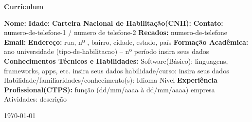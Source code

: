 \documentclass[a4paper,10pt]{report}
\begin{document}
\pagestyle{empty}
\begin{flushleft}
\begin{center}
\huge 
\textbf{Currículum}
\linebreak
\end{center}
  \textbf{Nome:} 
  \linebreak
  \textbf{Idade:} 
  \textbf{Carteira Nacional de Habilitação(CNH):}
  \linebreak
  \textbf{Contato:} numero-de-telefone-1 / numero de telefone-2
  \textbf{Recados:} numero-de-telefone
  \linebreak
  \textbf{ Email:} 
  \textbf{Endereço:} rua, nº , bairro, cidade, estado, país
  \linebreak
  \linebreak
  \textbf{Formação Acadêmica:}
  \linebreak
  \linebreak
  ano universidade (tipo-de-habilitacao) – nº período
  \linebreak
  \linebreak
  insira seus dados
  \linebreak
  \linebreak
  \textbf{Conhecimentos Técnicos e Habilidades:}
  \linebreak
  \linebreak
  Software(Básico): linguagens, frameworks, apps, etc.
  \linebreak
  insira seus dados
  \linebreak
  habilidade/curso: insira seus dados
  \linebreak
  Habilidade/familiaridades/conhecimento(s):
  \linebreak
  Idioma Nivel
  \linebreak
  \linebreak
  \textbf{Experiência Profissional(CTPS):}
  \linebreak
  \linebreak
  função (dd/mm/aaaa à dd/mm/aaaa)
  \linebreak
  empresa
  \linebreak
  Atividades: descrição
  \linebreak
\vspace*{5\baselineskip}
  \begin{center}
\today
\end{center}
\end{flushleft}
\end{document}
